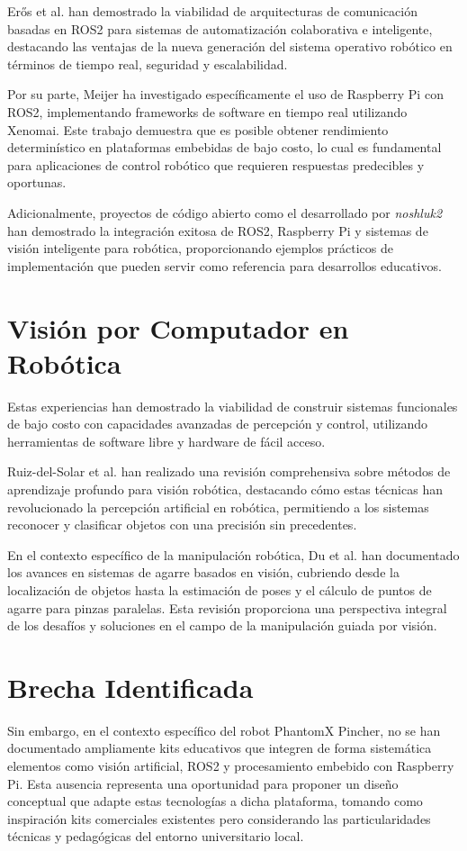 Erős et al. \cite{Eros2019} han demostrado la viabilidad de arquitecturas de comunicación basadas en ROS2 para sistemas de automatización colaborativa e inteligente, destacando las ventajas de la nueva generación del sistema operativo robótico en términos de tiempo real, seguridad y escalabilidad.

Por su parte, Meijer \cite{Meijer2021} ha investigado específicamente el uso de Raspberry Pi con ROS2, implementando frameworks de software en tiempo real utilizando Xenomai. Este trabajo demuestra que es posible obtener rendimiento determinístico en plataformas embebidas de bajo costo, lo cual es fundamental para aplicaciones de control robótico que requieren respuestas predecibles y oportunas.

Adicionalmente, proyectos de código abierto como el desarrollado por \textit{noshluk2} \cite{noshluk2} han demostrado la integración exitosa de ROS2, Raspberry Pi y sistemas de visión inteligente para robótica, proporcionando ejemplos prácticos de implementación que pueden servir como referencia para desarrollos educativos.

\section{Visión por Computador en Robótica}

Estas experiencias han demostrado la viabilidad de construir sistemas funcionales de bajo costo con capacidades avanzadas de percepción y control, utilizando herramientas de software libre y hardware de fácil acceso.

Ruiz-del-Solar et al. \cite{RuizDelSolar2018} han realizado una revisión comprehensiva sobre métodos de aprendizaje profundo para visión robótica, destacando cómo estas técnicas han revolucionado la percepción artificial en robótica, permitiendo a los sistemas reconocer y clasificar objetos con una precisión sin precedentes.

En el contexto específico de la manipulación robótica, Du et al. \cite{Du2019} han documentado los avances en sistemas de agarre basados en visión, cubriendo desde la localización de objetos hasta la estimación de poses y el cálculo de puntos de agarre para pinzas paralelas. Esta revisión proporciona una perspectiva integral de los desafíos y soluciones en el campo de la manipulación guiada por visión.

\section{Brecha Identificada}

Sin embargo, en el contexto específico del robot PhantomX Pincher, no se han documentado ampliamente kits educativos que integren de forma sistemática elementos como visión artificial, ROS2 y procesamiento embebido con Raspberry Pi. Esta ausencia representa una oportunidad para proponer un diseño conceptual que adapte estas tecnologías a dicha plataforma, tomando como inspiración kits comerciales existentes pero considerando las particularidades técnicas y pedagógicas del entorno universitario local.
